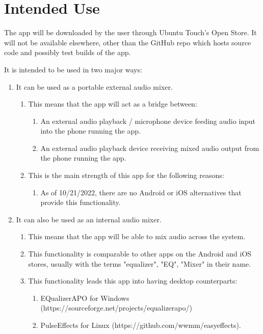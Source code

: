 
\section{Intended Use}
The app will be downloaded by the user through Ubuntu Touch's Open Store. 
It will not be available elsewhere, other than the GitHub repo which hosts source code and possibly test builds of the app.

It is intended to be used in two major ways:

\begin{enumerate}
	\item It can be used as a portable external audio mixer.
	\begin{enumerate} 
		\item This means that the app will act as a bridge between:
			\begin{enumerate}
				\item An external audio playback / microphone device feeding audio input into the phone running the app.
				\item An external audio playback device receiving mixed audio output from the phone running the app.
			\end{enumerate}
		\item This is the main strength of this app for the following reasons: 
		\begin{enumerate}
				\item As of 10/21/2022, there are no Android or iOS alternatives that provide this functionality.
			\end{enumerate}
	\end{enumerate}
	\item It can also be used as an internal audio mixer. 
	\begin{enumerate} 
		\item This means that the app will be able to mix audio across the system.
		\item This functionality is comparable to other apps on the Android and iOS stores, usually with the terms "equalizer", "EQ", "Mixer" in their name.
		\item This functionality leads this app into having desktop counterparts: 
		\begin{enumerate}
			\item EQualizerAPO for Windows (https://sourceforge.net/projects/equalizerapo/)
			\item PulseEffects for Linux (https://github.com/wwmm/easyeffects).
		\end{enumerate}


\end{enumerate}
\end{enumerate}
